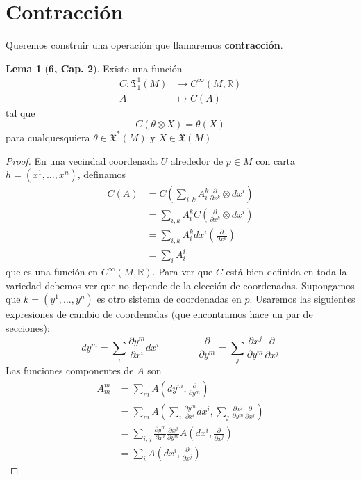 \documentclass[spanish]{book}
\theoremstyle{definition}
\newtheorem*{lema}{Lema}
\newcommand{\R}{\mathbb{R}}
\newcommand{\X}{\mathfrak{X}}
\newcommand{\T}{\mathfrak{T}}
\newcommand{\Cinf}{C^\infty}
\begin{document}
	\section{Contracción}
	Queremos construir una operación que llamaremos \textbf{contracción}. 
	
	\begin{lema}[\cite{ONeill}\textbf{6, Cap. 2}]
		Existe una función
		\begin{align*}
			C:\T^1_1(M)&\to \Cinf(M,\R)\\
			A&\mapsto C(A)
		\end{align*}
		tal que
			\[C(\theta\otimes X)=\theta(X)\]
		para cualquesquiera $\theta\in\X^*(M)$ y $X\in\X(M)$
	\end{lema}
	\begin{proof}
		En una vecindad coordenada $U$ alrededor de $p\in M$ con carta $h=(x^1,\ldots,x^n)$, definamos
		\begin{align*}
			C(A)&=C\left(\sum_{i,k}A_i^k\frac{\partial}{\partial x^k}\otimes dx^i\right)\\
			&=\sum_{i,k}A_i^kC\left(\frac{\partial}{\partial x^k}\otimes dx^i\right)\\
			&=\sum_{i,k}A_i^kdx^i\left(\frac{\partial}{\partial x^k}\right)\\
			&=\sum_iA^i_i
		\end{align*}
		que es una función en $\Cinf(M,\R)$. Para ver que $C$ está bien definida en toda la variedad debemos ver que no depende de la elección de coordenadas. Supongamos que $k=(y^1,\ldots,y^n)$ es otro sistema de coordenadas en $p$. Usaremos las siguientes expresiones de cambio de coordenadas (que encontramos hace un par de secciones):
		\[dy^m=\sum_ i\frac{\partial y^m}{\partial x^i}dx^i\qquad\qquad\frac{\partial}{\partial y^m}=\sum_j\frac{\partial x^j}{\partial y^m}\frac{\partial}{\partial x^j}\]
		Las funciones componentes de $A$ son
		\begin{align*}
			A^m_m&=\sum_mA\left(dy^m,\frac{\partial}{\partial y^m}\right)\\
			&=\sum_mA\left(\sum_ i\frac{\partial y^m}{\partial x^i}dx^i,\sum_j\frac{\partial x^j}{\partial y^m}\frac{\partial}{\partial x^j}\right)\\
			&=\sum_{i,j}\frac{\partial y^m}{\partial x^i}\frac{\partial x^j}{\partial y^m}A\left(dx^i,\frac{\partial}{\partial x^j}\right)\\
			&=\sum_iA\left(dx^i,\frac{\partial}{\partial x^j}\right)
		\end{align*}
		
	\end{proof}
	
\end{document}
